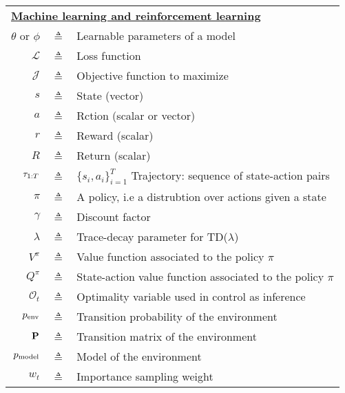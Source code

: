 \begin{table}[H]
\begin{center}
\begin{tabular}{r c p{10cm} }
\midrule
    \multicolumn{3}{l}{\textbf{\underline{Machine learning and reinforcement
    learning}}} \\
$\theta$ or $\phi$ & $\triangleq$ & Learnable parameters of a model\\
$\mathcal{L}$ & $\triangleq$ & Loss function\\
$\mathcal{J}$ & $\triangleq$ & Objective function to maximize\\
$s$  & $\triangleq$ & State (vector)\\
$a$  & $\triangleq$ & Rction (scalar or vector)\\
$r$  & $\triangleq$ & Reward (scalar) \\
$R$  & $\triangleq$ & Return (scalar) \\
$\tau_{1:T}$ & $\triangleq$ & $\{s_i, a_i\}_{i=1}^T$ Trajectory: sequence of state-action pairs\\
$\pi$ & $\triangleq$ & A policy, i.e a distrubtion over actions given a state\\
$\gamma$ & $\triangleq$ & Discount factor\\
$\lambda$ & $\triangleq$ & Trace-decay parameter for TD($\lambda$)\\
$V^\pi$  & $\triangleq$ & Value function associated to the policy $\pi$\\
$Q^\pi$  & $\triangleq$ & State-action value function associated to the policy $\pi$\\
$\mathcal{O}_t$ & $\triangleq$ & Optimality variable used in control as
    inference\\
$p_{\text{env}}$ & $\triangleq$ & Transition probability of the environment\\
${\mathbf{P}}$ & $\triangleq$ & Transition matrix of the environment\\
$p_{\rm{model}}$ & $\triangleq$ & Model of the environment\\
$w_t$ & $\triangleq$ & Importance sampling weight\\ 

\bottomrule
\end{tabular}
\end{center}
\label{tab:notation}
\end{table}

